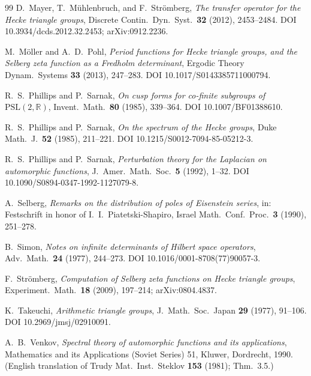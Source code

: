\documentclass[11pt]{amsart}
\theoremstyle{definition}
\theoremstyle{remark}
\begin{document}
\begin{thebibliography}{99}
D.~Mayer, T.~M\"uhlenbruch, and F.~Str\"omberg,
\emph{The transfer operator for the Hecke triangle groups},
Discrete Contin.\ Dyn.\ Syst.\ \textbf{32} (2012), 2453--2484.
DOI 10.3934/dcds.2012.32.2453;
arXiv:0912.2236.

M.~M\"oller and A.~D.~Pohl,
\emph{Period functions for Hecke triangle groups, and the Selberg
zeta function as a Fredholm determinant},
Ergodic Theory Dynam.\ Systems \textbf{33} (2013), 247--283.
DOI 10.1017/S0143385711000794.

R.~S.~Phillips and P.~Sarnak,
\emph{On cusp forms for co-finite subgroups of
$\mathrm{PSL}(2,\mathbb R)$},
Invent.\ Math.\ \textbf{80} (1985), 339--364.
DOI 10.1007/BF01388610.

R.~S.~Phillips and P.~Sarnak,
\emph{On the spectrum of the Hecke groups},
Duke Math.\ J.\ \textbf{52} (1985), 211--221.
DOI 10.1215/S0012-7094-85-05212-3.

R.~S.~Phillips and P.~Sarnak,
\emph{Perturbation theory for the Laplacian on automorphic
functions},
J.\ Amer.\ Math.\ Soc.\ \textbf{5} (1992), 1--32.
DOI 10.1090/S0894-0347-1992-1127079-8.

A.~Selberg,
\emph{Remarks on the distribution of poles of Eisenstein series},
in: Festschrift in honor of I.~I.~Piatetski-Shapiro,
Israel Math.\ Conf.\ Proc.\ \textbf{3} (1990), 251--278.

B.~Simon,
\emph{Notes on infinite determinants of Hilbert space operators},
Adv.\ Math.\ \textbf{24} (1977), 244--273.
DOI 10.1016/0001-8708(77)90057-3.

F.~Str\"omberg,
\emph{Computation of Selberg zeta functions on Hecke triangle
groups},
Experiment.\ Math.\ \textbf{18} (2009), 197--214;
arXiv:0804.4837.

K.~Takeuchi,
\emph{Arithmetic triangle groups},
J.\ Math.\ Soc.\ Japan \textbf{29} (1977), 91--106.
DOI 10.2969/jmsj/02910091.

A.~B.~Venkov,
\emph{Spectral theory of automorphic functions and its
applications},
Mathematics and its Applications (Soviet Series) 51, Kluwer,
Dordrecht, 1990.
(English translation of Trudy Mat.\ Inst.\ Steklov \textbf{153}
(1981); Thm.\ 3.5.)

\end{thebibliography}
\end{document}
